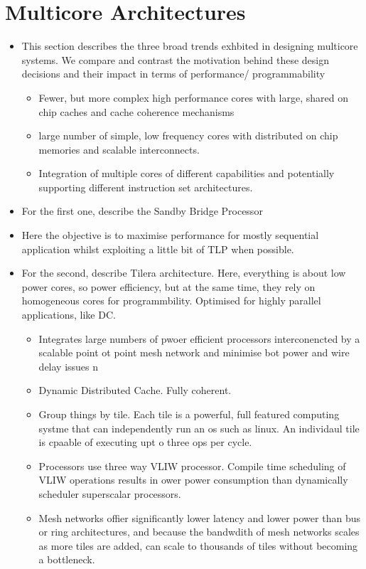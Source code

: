\section{Multicore Architectures}
\begin{itemize}
\item This section describes the three broad trends exhbited in designing
multicore systems. We compare and contrast the motivation
behind these design decisions and their impact in terms of performance/
programmability  
\begin{itemize}
\item Fewer, but more complex high performance cores with large,
shared on chip caches and cache coherence mechanisms
\item large number of simple, low frequency cores with distributed on chip
memories and scalable interconnects.
\item Integration of multiple cores of different capabilities and 
potentially supporting different instruction set architectures. 
\end{itemize}
\item For the first one, describe the Sandby Bridge Processor
\item Here the objective is to maximise performance for mostly sequential application
whilst exploiting a little bit of TLP when possible. 
\item For the second, describe Tilera architecture. Here, everything is about
low power cores, so power efficiency, but at the same time, they rely on 
homogeneous cores for programmbility. Optimised for highly parallel
applications, like DC. 
\begin{itemize}
\item Integrates large numbers of pwoer efficient processors interconencted by a scalable 
point ot point mesh network and minimise bot power and wire  delay issues
n\item Dynamic Distributed Cache. Fully coherent. 
\item Group things by tile. Each tile is a powerful, full featured computing systme 
that can independently run an os such as linux. 
An individaul tile is cpaable of executing upt o three ops per cycle. 
\item Processors use three way VLIW processor. Compile time scheduling of VLIW operations results in 
ower power consumption than dynamically scheduler superscalar processors. 
\item Mesh networks offier significantly lower latency and lower power than bus
or ring architectures, and because the bandwdith of mesh networks
scales as more tiles are added, can scale to thousands of tiles without 
becoming a bottleneck.


\end{itemize}
\end{itemize}
